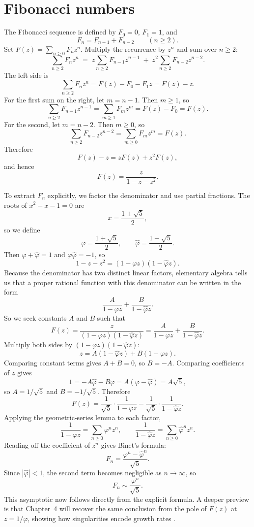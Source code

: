 \section*{Fibonacci numbers}

The Fibonacci sequence is defined by $F_0 = 0$, $F_1 = 1$, and
\[
  F_n = F_{n-1} + F_{n-2} \qquad (n \ge 2).
\]
Set $F(z) = \sum_{n \ge 0} F_n z^n$. Multiply the recurrence by $z^n$ and sum over $n \ge 2$:
\[
  \sum_{n \ge 2} F_n z^n
  \;=\; z \sum_{n \ge 2} F_{n-1} z^{n-1}
  \;+\; z^2 \sum_{n \ge 2} F_{n-2} z^{n-2}.
\]
The left side is
\[
  \sum_{n \ge 2} F_n z^n = F(z) - F_0 - F_1 z = F(z)-z.
\]
For the first sum on the right, let $m=n-1$. Then $m \ge 1$, so
\[
  \sum_{n \ge 2} F_{n-1} z^{n-1}
  = \sum_{m \ge 1} F_m z^m
  = F(z)-F_0
  = F(z).
\]
For the second, let $m=n-2$. Then $m \ge 0$, so
\[
  \sum_{n \ge 2} F_{n-2} z^{n-2}
  = \sum_{m \ge 0} F_m z^m
  = F(z).
\]
Therefore
\[
  F(z)-z = zF(z) + z^2F(z),
\]
and hence
\[
  F(z) = \frac{z}{1-z-z^2}.
\]

To extract $F_n$ explicitly, we factor the denominator and use partial fractions. The roots of $x^2-x-1=0$ are
\[
  x = \frac{1 \pm \sqrt{5}}{2},
\]
so we define
\[
  \varphi = \frac{1+\sqrt{5}}{2}, \qquad \hat{\varphi} = \frac{1-\sqrt{5}}{2}.
\]
Then $\varphi+\hat{\varphi}=1$ and $\varphi\hat{\varphi}=-1$, so
\[
  1-z-z^2 = (1-\varphi z)(1-\hat{\varphi} z).
\]
Because the denominator has two distinct linear factors, elementary algebra tells us that a proper rational function with this denominator can be written in the form
\[
  \frac{A}{1-\varphi z} + \frac{B}{1-\hat{\varphi} z}.
\]
So we seek constants $A$ and $B$ such that
\[
  F(z)
  = \frac{z}{(1-\varphi z)(1-\hat{\varphi} z)}
  = \frac{A}{1-\varphi z} + \frac{B}{1-\hat{\varphi} z}.
\]
Multiply both sides by $(1-\varphi z)(1-\hat{\varphi} z)$:
\[
  z = A(1-\hat{\varphi} z) + B(1-\varphi z).
\]
Comparing constant terms gives $A+B=0$, so $B=-A$. Comparing coefficients of $z$ gives
\[
  1 = -A\hat{\varphi} - B\varphi = A(\varphi-\hat{\varphi}) = A\sqrt{5},
\]
so $A=1/\sqrt{5}$ and $B=-1/\sqrt{5}$. Therefore
\[
  F(z)
  = \frac{1}{\sqrt{5}} \cdot \frac{1}{1-\varphi z}
  - \frac{1}{\sqrt{5}} \cdot \frac{1}{1-\hat{\varphi} z}.
\]
Applying the geometric-series lemma to each factor,
\[
  \frac{1}{1-\varphi z} = \sum_{n \ge 0} \varphi^n z^n,
  \qquad
  \frac{1}{1-\hat{\varphi} z} = \sum_{n \ge 0} \hat{\varphi}^n z^n.
\]
Reading off the coefficient of $z^n$ gives Binet's formula:
\[
  F_n = \frac{\varphi^n-\hat{\varphi}^n}{\sqrt{5}}.
\]
Since $|\hat{\varphi}| < 1$, the second term becomes negligible as $n \to \infty$, so
\[
  F_n \sim \frac{\varphi^n}{\sqrt{5}}.
\]
This asymptotic now follows directly from the explicit formula. A deeper preview is that Chapter~4 will recover the same conclusion from the pole of $F(z)$ at $z=1/\varphi$, showing how singularities encode growth rates \cite{FlajoletSedgewick2009}.

